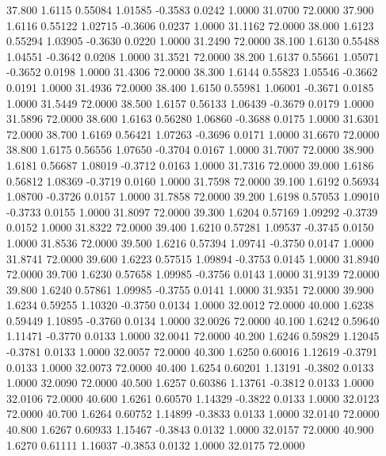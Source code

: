   37.800   1.6115   0.55084   1.01585  -0.3583   0.0242   1.0000  31.0700  72.0000
  37.900   1.6116   0.55122   1.02715  -0.3606   0.0237   1.0000  31.1162  72.0000
  38.000   1.6123   0.55294   1.03905  -0.3630   0.0220   1.0000  31.2490  72.0000
  38.100   1.6130   0.55488   1.04551  -0.3642   0.0208   1.0000  31.3521  72.0000
  38.200   1.6137   0.55661   1.05071  -0.3652   0.0198   1.0000  31.4306  72.0000
  38.300   1.6144   0.55823   1.05546  -0.3662   0.0191   1.0000  31.4936  72.0000
  38.400   1.6150   0.55981   1.06001  -0.3671   0.0185   1.0000  31.5449  72.0000
  38.500   1.6157   0.56133   1.06439  -0.3679   0.0179   1.0000  31.5896  72.0000
  38.600   1.6163   0.56280   1.06860  -0.3688   0.0175   1.0000  31.6301  72.0000
  38.700   1.6169   0.56421   1.07263  -0.3696   0.0171   1.0000  31.6670  72.0000
  38.800   1.6175   0.56556   1.07650  -0.3704   0.0167   1.0000  31.7007  72.0000
  38.900   1.6181   0.56687   1.08019  -0.3712   0.0163   1.0000  31.7316  72.0000
  39.000   1.6186   0.56812   1.08369  -0.3719   0.0160   1.0000  31.7598  72.0000
  39.100   1.6192   0.56934   1.08700  -0.3726   0.0157   1.0000  31.7858  72.0000
  39.200   1.6198   0.57053   1.09010  -0.3733   0.0155   1.0000  31.8097  72.0000
  39.300   1.6204   0.57169   1.09292  -0.3739   0.0152   1.0000  31.8322  72.0000
  39.400   1.6210   0.57281   1.09537  -0.3745   0.0150   1.0000  31.8536  72.0000
  39.500   1.6216   0.57394   1.09741  -0.3750   0.0147   1.0000  31.8741  72.0000
  39.600   1.6223   0.57515   1.09894  -0.3753   0.0145   1.0000  31.8940  72.0000
  39.700   1.6230   0.57658   1.09985  -0.3756   0.0143   1.0000  31.9139  72.0000
  39.800   1.6240   0.57861   1.09985  -0.3755   0.0141   1.0000  31.9351  72.0000
  39.900   1.6234   0.59255   1.10320  -0.3750   0.0134   1.0000  32.0012  72.0000
  40.000   1.6238   0.59449   1.10895  -0.3760   0.0134   1.0000  32.0026  72.0000
  40.100   1.6242   0.59640   1.11471  -0.3770   0.0133   1.0000  32.0041  72.0000
  40.200   1.6246   0.59829   1.12045  -0.3781   0.0133   1.0000  32.0057  72.0000
  40.300   1.6250   0.60016   1.12619  -0.3791   0.0133   1.0000  32.0073  72.0000
  40.400   1.6254   0.60201   1.13191  -0.3802   0.0133   1.0000  32.0090  72.0000
  40.500   1.6257   0.60386   1.13761  -0.3812   0.0133   1.0000  32.0106  72.0000
  40.600   1.6261   0.60570   1.14329  -0.3822   0.0133   1.0000  32.0123  72.0000
  40.700   1.6264   0.60752   1.14899  -0.3833   0.0133   1.0000  32.0140  72.0000
  40.800   1.6267   0.60933   1.15467  -0.3843   0.0132   1.0000  32.0157  72.0000
  40.900   1.6270   0.61111   1.16037  -0.3853   0.0132   1.0000  32.0175  72.0000
